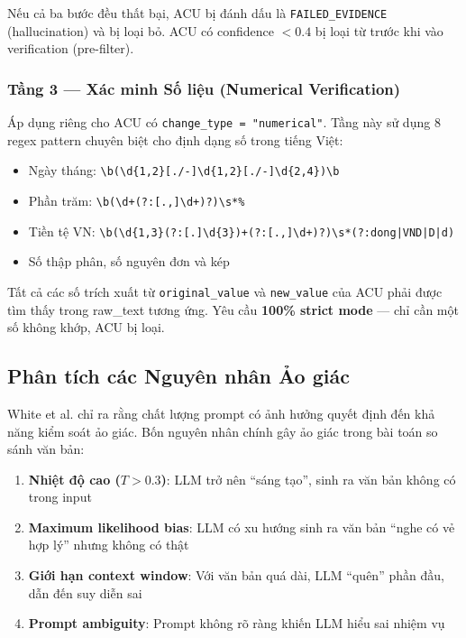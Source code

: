 Nếu cả ba bước đều thất bại, ACU bị đánh dấu là \texttt{FAILED\_EVIDENCE} (hallucination) và bị loại bỏ. ACU có confidence $< 0.4$ bị loại từ trước khi vào verification (pre-filter).

\subsubsection{Tầng 3 — Xác minh Số liệu (Numerical Verification)}

Áp dụng riêng cho ACU có \texttt{change\_type = "numerical"}. Tầng này sử dụng 8 regex pattern chuyên biệt cho định dạng số trong tiếng Việt:

\begin{itemize}
    \item Ngày tháng: \texttt{\textbackslash b(\textbackslash d\{1,2\}[./-]\textbackslash d\{1,2\}[./-]\textbackslash d\{2,4\})\textbackslash b}
    \item Phần trăm: \texttt{\textbackslash b(\textbackslash d+(?:[.,]\textbackslash d+)?)\textbackslash s*\%}
    \item Tiền tệ VN: \texttt{\textbackslash b(\textbackslash d\{1,3\}(?:[.]\textbackslash d\{3\})+(?:[.,]\textbackslash d+)?)\textbackslash s*(?:dong|VND|D|d)}
    \item Số thập phân, số nguyên đơn và kép
\end{itemize}

Tất cả các số trích xuất từ \texttt{original\_value} và \texttt{new\_value} của ACU phải được tìm thấy trong raw\_text tương ứng. Yêu cầu \textbf{100\% strict mode} — chỉ cần một số không khớp, ACU bị loại.

\subsection{Phân tích các Nguyên nhân Ảo giác}

White et al. \cite{white2023prompt} chỉ ra rằng chất lượng prompt có ảnh hưởng quyết định đến khả năng kiểm soát ảo giác. Bốn nguyên nhân chính gây ảo giác trong bài toán so sánh văn bản:

\begin{enumerate}[label=(\arabic*)]
    \item \textbf{Nhiệt độ cao ($T > 0.3$)}: LLM trở nên ``sáng tạo'', sinh ra văn bản không có trong input
    \item \textbf{Maximum likelihood bias}: LLM có xu hướng sinh ra văn bản ``nghe có vẻ hợp lý'' nhưng không có thật
    \item \textbf{Giới hạn context window}: Với văn bản quá dài, LLM ``quên'' phần đầu, dẫn đến suy diễn sai
    \item \textbf{Prompt ambiguity}: Prompt không rõ ràng khiến LLM hiểu sai nhiệm vụ
\end{enumerate}

